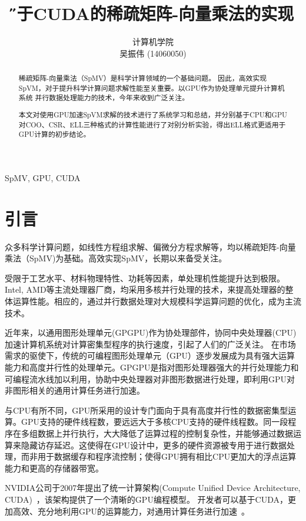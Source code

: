 \documentclass[11pt,twocolumn]{article}
\title{\H 基于CUDA的稀疏矩阵-向量乘法的实现}
\author{计算机学院\\吴振伟 (14060050)}
\date{}
\begin{document}
\maketitle

\renewcommand\abstractname{摘 要}
\begin{abstract}
稀疏矩阵-向量乘法（SpMV）是科学计算领域的一个基础问题。
因此，高效实现SpVM，对于提升科学计算问题求解性能至关重要。以GPU作为协处理单元提升计算机系统
并行数据处理能力的技术，今年来收到广泛关注。

本文对使用GPU加速SpVM求解的技术进行了系统学习和总结，并分别基于CPU和GPU对COO、CSR、ELL三种格式的计算性能进行了对别分析实验，得出ELL格式更适用于GPU计算的初步结论。\\
\end{abstract}

 SpMV, GPU, CUDA

\section{引言}
众多科学计算问题，如线性方程组求解、偏微分方程求解等，均以稀疏矩阵-向量乘法（SpMV)为基础。高效实现SpMV，长期以来备受关注。

受限于工艺水平、材料物理特性、功耗等因素，单处理机性能提升达到极限。Intel, AMD等主流处理器厂商，均采用多核并行处理的技术，来提高处理器的整体运算性能。相应的，通过并行数据处理对大规模科学运算问题的优化，成为主流技术。

近年来，以通用图形处理单元(GPGPU)作为协处理部件，协同中央处理器(CPU)加速计算机系统对计算密集型程序的执行速度，引起了人们的广泛关注。
在市场需求的驱使下，传统的可编程图形处理单元（GPU）逐步发展成为具有强大运算能力和高度并行性的处理单元。GPGPU是指对图形处理器强大的并行处理能力和可编程流水线加以利用，协助中央处理器对非图形数据进行处理，即利用GPU对非图形相关的通用计算任务进行加速。

与CPU有所不同，GPU所采用的设计专门面向于具有高度并行性的数据密集型运算。GPU支持的硬件线程数，要远远大于多核CPU支持的硬件线程数。同一段程序在多组数据上并行执行，大大降低了运算过程的控制复杂性，并能够通过数据运算来隐藏访存延迟。这使得在GPU设计中，更多的硬件资源被专用于进行数据处理，而非用于数据缓存和程序流控制；使得GPU拥有相比CPU更加大的浮点运算能力和更高的存储器带宽。

NVIDIA公司于2007年提出了统一计算架构(Compute Unified Device Architecture, CUDA)~\cite{Nickolls:2008:SPP:1365490.1365500}，该架构提供了一个清晰的GPU编程模型。
开发者可以基于CUDA，更加高效、充分地利用GPU的运算能力，对通用计算任务进行加速~\cite{Applications}。
\end{document}
